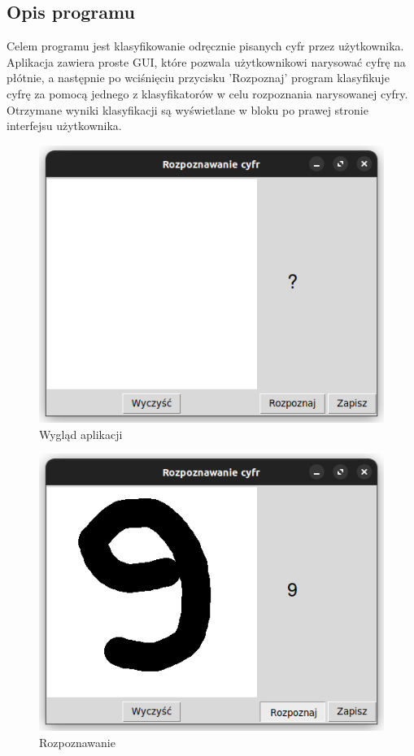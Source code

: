 \documentclass[12pt,a4paper]{article}
\begin{document}
\subsection{Opis programu}
Celem programu jest klasyfikowanie odręcznie pisanych cyfr przez użytkownika. Aplikacja zawiera proste GUI,
które pozwala użytkownikowi narysować cyfrę na płótnie, a następnie po wciśnięciu przycisku 'Rozpoznaj' program
klasyfikuje cyfrę za pomocą jednego z klasyfikatorów w celu rozpoznania narysowanej cyfry. Otrzymane wyniki
klasyfikacji są wyświetlane w bloku po prawej stronie interfejsu użytkownika.
\begin{figure}[!h]
	\includegraphics{"app1.png"}
	\centering
	\caption{Wygląd aplikacji}
\end{figure}
\newpage
\begin{figure}[!h]
	\includegraphics{"app2.png"}
	\centering
	\caption{Rozpoznawanie}
\end{figure}
\end{document}
